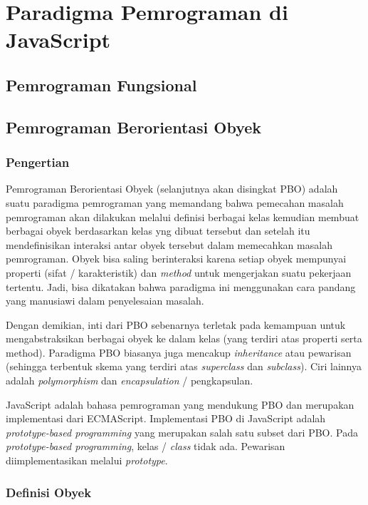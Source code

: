 \chapter{Paradigma Pemrograman di JavaScript}

\section{Pemrograman Fungsional}


\section{Pemrograman Berorientasi Obyek}

\subsection{Pengertian}

Pemrograman Berorientasi Obyek (selanjutnya akan disingkat PBO) adalah suatu paradigma pemrograman yang memandang bahwa pemecahan masalah pemrograman akan dilakukan melalui definisi berbagai kelas kemudian membuat berbagai obyek berdasarkan kelas yng dibuat tersebut dan setelah itu mendefinisikan interaksi antar obyek tersebut dalam memecahkan masalah pemrograman. Obyek bisa saling berinteraksi karena setiap obyek mempunyai properti (sifat / karakteristik) dan \textit{method} untuk mengerjakan suatu pekerjaan tertentu. Jadi, bisa dikatakan bahwa paradigma ini menggunakan cara pandang yang manusiawi dalam penyelesaian masalah.

Dengan demikian, inti dari PBO sebenarnya terletak pada kemampuan untuk mengabstraksikan berbagai obyek ke dalam kelas (yang terdiri atas properti serta method). Paradigma PBO biasanya juga mencakup \textit{inheritance} atau pewarisan (sehingga terbentuk skema yang terdiri atas \textit{superclass} dan \textit{subclass}). Ciri lainnya adalah \textit{polymorphism} dan \textit{encapsulation} / pengkapsulan.

JavaScript adalah bahasa pemrograman yang mendukung PBO dan merupakan implementasi dari ECMAScript. Implementasi PBO di JavaScript adalah \textit{prototype-based programming} yang merupakan salah satu subset dari PBO. Pada \textit{prototype-based programming}, kelas / \textit{class} tidak ada. Pewarisan diimplementasikan melalui \textit{prototype}.

\subsection{Definisi Obyek}

